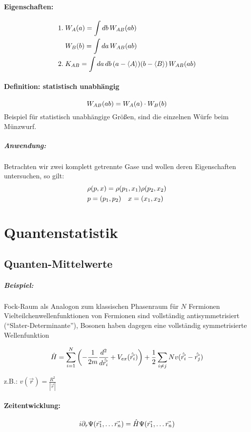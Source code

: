 \paragraph{Eigenschaften:}
\begin{align*}
	1.\; &\wkeit{A} = \int db \, \wkeit{AB}\\
	     &\wkeit{B} = \int da \, \wkeit{AB}\\
	2.\; &K_{AB} = \int da \, db \, ( a - \erw{A} ) (b - \erw{B} ) \, 
	     \wkeit{AB}
\end{align*}

\paragraph{Definition: statistisch unabhängig}
\[
	\wkeit{AB} = \wkeit{A} \cdot \wkeit{B}
\]
Beispiel für statistisch unabhängige Größen, sind die einzelnen Würfe beim Münzwurf.

\subparagraph{Anwendung:}
Betrachten wir zwei komplett getrennte Gase und wollen deren Eigenschaften
untersuchen, so gilt:
\begin{align*}
	&\rho ( p , x ) = \rho (p_{1}, x_{1}) \rho (p_{2}, x_{2})\\
	&p=(p_{1},p_{2}) \quad x = (x_{1}, x_{2})
\end{align*}

	\section{Quantenstatistik}
	\subsection{Quanten-Mittelwerte}

\subparagraph{Beispiel:} Fock-Raum als Analogon zum klassischen Phasenraum für $N$
Fermionen\\

Vielteilchenwellenfunktionen von Fermionen sind vollständig antisymmetrisiert
("`Slater-Determinante"'), Bosonen haben dagegen eine vollständig symmetrisierte 
Wellenfunktion

\[
    \hat{H} = \sum_{i=1}^{N} \left( - \frac{1}{2m} \frac{d^{2}}{d\hat{\vec{r_{i}}}} + V_{ex}
               (\hat{\vec{r_{i}}}) \right) + \frac12 \sum_{i \neq j}{N} v(\hat{\vec{r_{i}}} - \hat{\vec{r_{j}}})
\]

z.B.: $v(\vec{r}) = \frac{R^{2}}{|\vec{r}|}$

\paragraph{Zeitentwicklung:}
\[
    i \partial_{r} \Psi ( \vec{r_{1}}, \dots \vec{r_{n}}) = \hat{H} \Psi ( \vec{r_{1}}, \dots \vec{r_{n}})
\]

